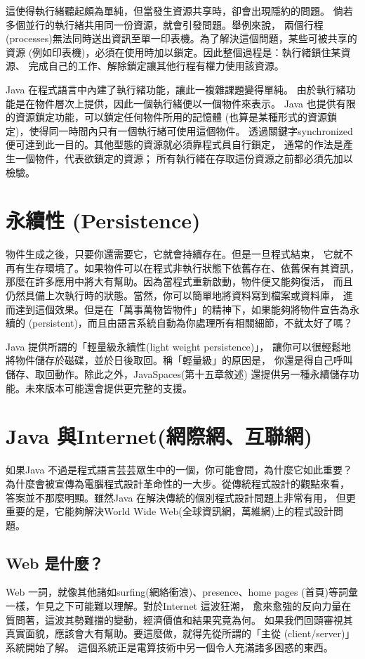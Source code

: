 這使得執行緒聽起頗為單純，但當發生資源共享時，卻會出現隱約的問題。
倘若多個並行的執行緒共用同一份資源，就會引發問題。舉例來說， 兩個行程
(processes)無法同時送出資訊至單一印表機。為了解決這個問題，某些可被共享的資源
(例如印表機)，必須在使用時加以鎖定。因此整個過程是：執行緒鎖住某資源、
完成自己的工作、解除鎖定讓其他行程有權力使用該資源。

Java 在程式語言中內建了執行緒功能，讓此一複雜課題變得單純。
由於執行緒功能是在物件層次上提供，因此一個執行緒便以一個物件來表示。
Java 也提供有限的資源鎖定功能，可以鎖定任何物件所用的記憶體
(也算是某種形式的資源鎖定)，使得同一時間內只有一個執行緒可使用這個物件。
透過關鍵字synchronized 便可達到此一目的。其他型態的資源就必須靠程式員自行鎖定，
通常的作法是產生一個物件，代表欲鎖定的資源；
所有執行緒在存取這份資源之前都必須先加以檢驗。

\section{永續性 (Persistence)} 
物件生成之後，只要你還需要它，它就會持續存在。但是一旦程式結束，
它就不再有生存環境了。如果物件可以在程式非執行狀態下依舊存在、依舊保有其資訊，
那麼在許多應用中將大有幫助。因為當程式重新啟動，物件便又能夠復活，
而且仍然具備上次執行時的狀態。當然，你可以簡單地將資料寫到檔案或資料庫，
進而達到這個效果。但是在「萬事萬物皆物件」的精神下，如果能夠將物件宣告為永續的
(persistent)，而且由語言系統自動為你處理所有相關細節，不就太好了嗎？

Java 提供所謂的「輕量級永續性(light weight persistence)」，
讓你可以很輕鬆地將物件儲存於磁碟，並於日後取回。稱「輕量級」的原因是，
你還是得自己呼叫儲存、取回動作。除此之外，JavaSpaces(第十五章敘述)
還提供另一種永續儲存功能。未來版本可能還會提供更完整的支援。
\section{Java 與Internet(網際網、互聯網)}
如果Java 不過是程式語言芸芸眾生中的一個，你可能會問，為什麼它如此重要？
為什麼會被宣傳為電腦程式設計革命性的一大步。從傳統程式設計的觀點來看，
答案並不那麼明顯。雖然Java 在解決傳統的個別程式設計問題上非常有用，
但更重要的是，它能夠解決World Wide Web(全球資訊網，萬維網)上的程式設計問題。
\subsection{Web 是什麼？}
Web 一詞，就像其他諸如surfing(網絡衝浪)、presence、home pages
(首頁)等詞彙一樣，乍見之下可能難以理解。對於Internet 這波狂潮，
愈來愈強的反向力量在質問著，這波其勢難擋的變動，經濟價值和結果究竟為何。
如果我們回頭審視其真實面貌，應該會大有幫助。要這麼做，就得先從所謂的「主從
(client/server)」系統開始了解。
這個系統正是電算技術中另一個令人充滿諸多困惑的東西。

